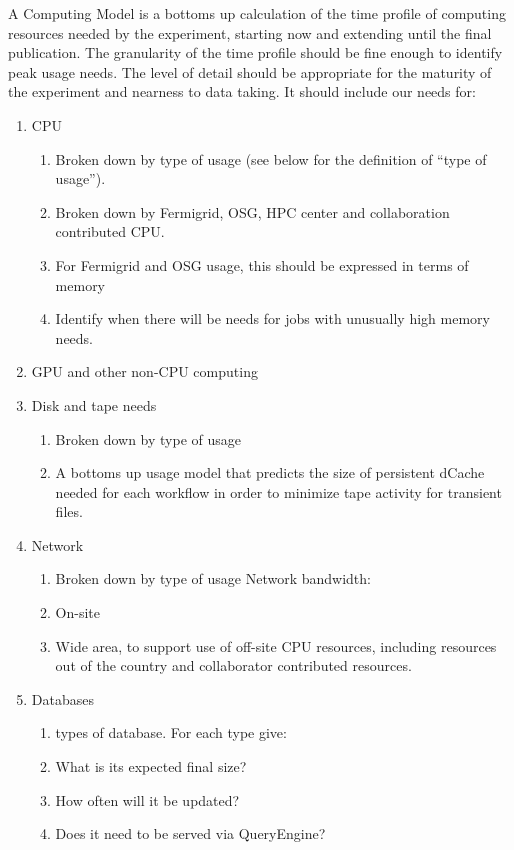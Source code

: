 A Computing Model is a bottoms up calculation of the time profile of computing resources needed by the experiment, starting now and extending until the final publication. The granularity of the time profile should be fine enough to identify peak usage needs. The level of detail should be appropriate for the maturity of the experiment and nearness to data taking.
It should include our needs for:
\begin{enumerate}
  \item CPU
    \begin{enumerate}
      \item Broken down by type of usage (see below for the definition of “type of usage”).
      \item Broken down by Fermigrid, OSG, HPC center and collaboration contributed CPU.
      \item For Fermigrid and OSG usage, this should be expressed in terms of memory
      \item Identify when there will be needs for jobs with unusually high memory needs.
    \end{enumerate}

  \item GPU and other non-CPU computing
  \item Disk and tape needs
    \begin{enumerate}
      \item Broken down by type of usage
      \item A bottoms up usage model that predicts the size of persistent dCache needed for
        each workflow in order to minimize tape activity for transient files.
    \end{enumerate}
  \item Network
    \begin{enumerate}
      \item Broken down by type of usage Network bandwidth:
      \item On-site
      \item Wide area, to support use of off-site CPU resources, including resources out of
        the country and collaborator contributed resources.
    \end{enumerate}

  \item  Databases
    \begin{enumerate}
      \item types of database.  For each type give:
      \item What is its expected final size?
      \item How often will it be updated?
      \item Does it need to be served via QueryEngine?
    \end{enumerate}
\end{enumerate}
